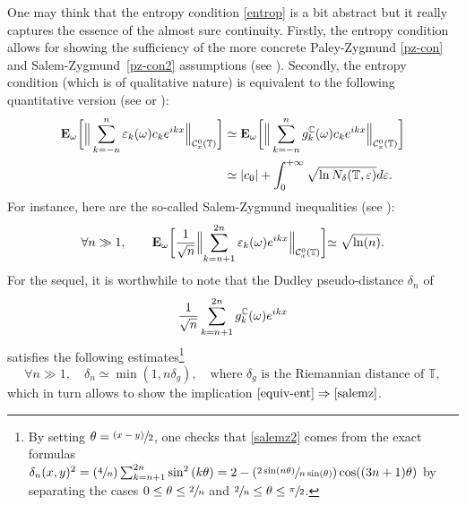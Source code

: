 \documentclass[11pt]{article}
\newcommand{\Psfrac}[2]{(\sfrac{#1}{#2})}
\newcommand{\psfrac}[2]{\sfrac{(#1)}{#2}}
\theoremstyle{theorem}
\theoremstyle{definition}
\newcommand\E{\mathbf{E}}
\newcommand\CC{\mathcal{C}}
\newcommand\T{\mathbb{T}}
\newcommand\ep{\varepsilon}
\begin{document}
One may think that the entropy condition \eqref{entrop} is a bit abstract but it really captures the essence of the almost sure continuity.
Firstly, the entropy condition allows for showing the sufficiency of the more concrete Paley-Zygmund \eqref{pz-con} and Salem-Zygmund~\eqref{pz-con2} assumptions (see \cite[Part VII.1]{pisier1981}).
Secondly, the entropy condition (which is of qualitative nature) is equivalent to the following quantitative version (see \cite[p.\,11]{pisier1981} or \cite[p.\,3--4]{pisier1977}):\vspace*{-3pt}
\begin{equation}\label{equiv-ent}
\begin{aligned}
\E_\omega\biggl[\Big\|\sum_{k=-n}^n \ep_k(\omega) c_k e^{ikx} \Big\|_{\CC_x^0(\mathcal{\mathbb{T}})}\biggr] & \simeq \E_\omega\biggl[\Big\|\sum_{k=-n}^n g_k^{\C}(\omega) c_k e^{ikx} \Big\|_{\CC_x^0(\mathcal{\mathbb{T}})}\biggr]\\ 
& \simeq |c_0|+\int_{0}^{+\infty} \sqrt{\ln N_{\delta}(\T,\ep)} d\ep.
\end{aligned}
\end{equation}
For instance, here are the so-called Salem-Zygmund inequalities (see \cite[p.\,259]{queff2}):\vspace*{-3pt}
\begin{equation}\label{salemz}
\forall n\gg 1, \qquad \E_{\omega}\biggl[\frac{1}{\sqrt{n}}\Bigl\Vert \sum_{k=n+1}^{2n}\ep_k(\omega) e^{ikx} \Bigr\Vert_{\CC_x^0(\mathbb{T})} \biggl]\simeq \sqrt{\ln(n)}.
\end{equation}
For the sequel, it is worthwhile to note that the Dudley pseudo-distance $\delta_n$ of\vspace*{-3pt}
\begin{equation*}
\frac{1}{\sqrt{n}}\sum_{k=n+1}^{2n}g_k^{\mathbb{C}}(\omega) e^{ikx}
\end{equation*} satisfies the following estimates\footnote{
By setting $\theta=\psfrac{x-y}{2}$, one checks that \eqref{salemz2} comes from the exact formulas $\delta_n(x,y)^2 = \Psfrac{4}{n}\sum_{k=n+1}^{2n} \sin^2\left(k\theta\right)=2-\Psfrac{2\sin(n\theta)}{n\sin(\theta)}\cos((3n+1)\theta)$ by separating the cases $0\leq \theta\leq \sfrac{2}{n}$ and $\sfrac{2}{n}\leq \theta\leq \sfrac{\pi}{2}$.}
\begin{equation}\label{salemz2}
\forall n\gg1, \quad \delta_n\simeq \min(1,n\delta_{g}), \quad \text{where $\delta_{g}$ is the Riemannian distance of }\mathbb{T},
\end{equation}
which in turn allows to show the implication $\eqref{equiv-ent}\Rightarrow\eqref{salemz}$.
\end{document}
